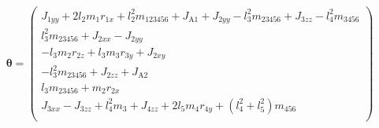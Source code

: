 {\footnotesize
\begin{equation}
\label{eq:Parametersatz}
	\boldsymbol{\theta}= 
		\begin{pmatrix}
			J_{1yy} + 2 l_2 m_1 r_{1x} + l_2^2 m_{123456} + J_{\text{A}1} + J_{2yy} - l_3^2 m_{23456} + J_{3zz} - l_4^2 m_{3456} \\
			l_3^2 m_{23456} + J_{2xx} - J_{2yy} \\
			- l_3 m_2 r_{2z} + l_3 m_3 r_{3y} + J_{2xy} \\
			- l_3^2 m_{23456} + J_{2zz} + J_{\text{A}2} \\
			l_3 m_{23456} + m_2 r_{2x} \\
			J_{3xx} -J_{3zz} + l_4^2 m_3 + J_{4zz} + 2 l_5 m_4 r_{4y} + (l_4^2 +l_5^2) m_{456} \\

\end{pmatrix}
\end{equation}}
